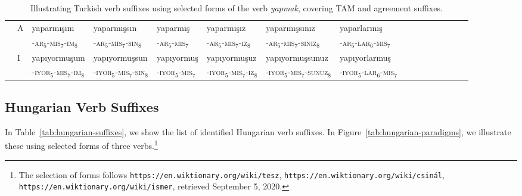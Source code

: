 \documentclass[11pt,letterpaper]{article}
\begin{document}
\begin{table}
{\begin{tabular}{ll||lll|lllllllllll}
               & A & yaparmışım &	yaparmışsın &	yaparmış &	yaparmışız &	yaparmışsınız& 	yaparlarmış \\ 
            &  & -\textsc{ar}$_5$-\textsc{mis}$_7$-\textsc{im}$_8$ &	-\textsc{ar}$_5$-\textsc{mis}$_7$-\textsc{sin}$_8$ &	-\textsc{ar}$_5$-\textsc{mis}$_7$ &	-\textsc{ar}$_5$-\textsc{mis}$_7$-\textsc{iz}$_8$ &	-\textsc{ar}$_5$-\textsc{mis}$_7$-\textsc{siniz}$_8$& 	-\textsc{ar}$_5$-\textsc{lar}$_6$-\textsc{mis}$_7$ \\ \hline
               & I & yapıyormuşum &	yapıyormuşsun &	yapıyormuş &	yapıyormuşuz &	yapıyormuşsunuz &	yapıyorlarmuş \\
	       &              & -\textsc{iyor}$_5$-\textsc{mis}$_7$-\textsc{im}$_8$ &	-\textsc{iyor}$_5$-\textsc{mis}$_7$-\textsc{sin}$_8$ &	-\textsc{iyor}$_5$-\textsc{mis}$_7$ &	-\textsc{iyor}$_5$-\textsc{mis}$_7$-\textsc{iz}$_8$ &	-\textsc{iyor}$_5$-\textsc{mis}$_7$-\textsc{sunuz}$_8$ &	-\textsc{iyor}$_5$-\textsc{lar}$_6$-\textsc{mis}$_7$ \\
\end{tabular}
}
\caption{Illustrating Turkish verb suffixes using selected forms of the verb \textit{yapmak}, covering TAM and agreement suffixes.}\label{tab:turkish-yapmak}
\end{table}




\subsection{Hungarian Verb Suffixes}


In Table~\ref{tab:hungarian-suffixes}, we show the list of identified Hungarian verb suffixes.
In Figure~\ref{tab:hungarian-paradigms}, we illustrate these using selected forms of three verbs.\footnote{The selection of forms follows \texttt{https://en.wiktionary.org/wiki/tesz},
\texttt{https://en.wiktionary.org/wiki/csinál},
\texttt{https://en.wiktionary.org/wiki/ismer}, retrieved September 5, 2020.}
\end{document}
